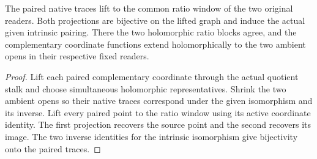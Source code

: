 \begin{theorem}
\label{hir:g1-actual-paired-ratio-graph}
\leanok
The paired native traces lift to the common ratio window of
the two original readers. Both projections are bijective on
the lifted graph and induce the actual given intrinsic pairing.
There the two holomorphic ratio blocks agree, and the complementary
coordinate functions extend holomorphically to the two ambient
opens in their respective fixed readers.
\end{theorem}
\begin{proof}
Lift each paired complementary coordinate through the actual
quotient stalk and choose simultaneous holomorphic representatives.
Shrink the two ambient opens so their native traces correspond
under the given isomorphism and its inverse. Lift every paired
point to the ratio window using its active coordinate identity.
The first projection recovers the source point and the second
recovers its image. The two inverse identities for the intrinsic
isomorphism give bijectivity onto the paired traces.
\end{proof}

